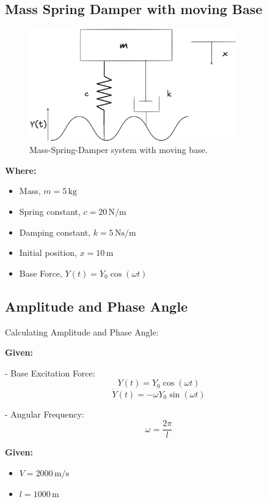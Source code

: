 \documentclass[12pt,a4paper]{article}
\begin{document}
\subsection{Mass Spring Damper with moving Base}
\begin{figure}[H]
    \centering
    \includegraphics[width=0.8\textwidth]{msd_base.png} 
    \caption{Mass-Spring-Damper system with moving base.}
    \label{fig:system}
\end{figure}
\textbf{Where:}
\begin{itemize}
    \item Mass, \(m = 5 \, \text{kg}\)
    \item Spring constant, \(c = 20 \, \text{N/m}\)
    \item Damping constant, \(k = 5 \, \text{Ns/m}\)
    \item Initial position, \(x = 10 \, \text{m}\)
    \item Base Force, \(Y(t) = Y_0 \cos(\omega t)\)    
\end{itemize}

\subsection{Amplitude and Phase Angle}

Calculating Amplitude and Phase Angle:  

{\vspace{5pt}}

\textbf{Given:}

- Base Excitation Force: 
\[
Y(t) = Y_0 \cos(\omega t)
\]
\[
\dot{Y}(t) = -\omega Y_0 \sin(\omega t)
\]

- Angular Frequency: 
\[
\omega = \frac{2 \pi}{l}
\]

\textbf{Given:}
\begin{itemize}
    \item \( V = 2000 \, \text{m/s} \)
    \item \( l = 1000 \, \text{m} \)
\end{itemize}
\end{document}
